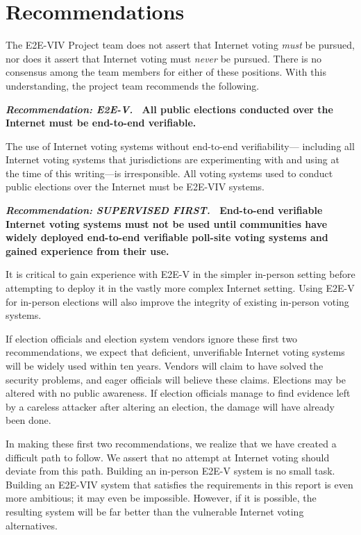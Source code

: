 \section{Recommendations}

The E2E-VIV Project team does not assert that Internet voting
\emph{must} be pursued, nor does it assert that Internet voting must
\emph{never} be pursued. There is no consensus among the team members
for either of these positions. With this understanding, the project
team recommends the following.

\vspace{12pt} 
\textbf{\emph{Recommendation: E2E-V.} \ All public elections conducted
  over the Internet must be end-to-end verifiable.} 

The use of Internet voting systems without end-to-end verifiability---
including all Internet voting systems that jurisdictions are
experimenting with and using at the time of this writing---is
irresponsible. All voting systems used to conduct public elections
over the Internet must be E2E-VIV systems.

\vspace{12pt}
\textbf{\emph{Recommendation: SUPERVISED FIRST.} \ End-to-end
  verifiable Internet voting systems must not be used until
  communities have widely deployed end-to-end verifiable poll-site
  voting systems and gained experience from their use.}

It is critical to gain experience with E2E-V in the simpler in-person
setting before attempting to deploy it in the vastly more complex
Internet setting. Using E2E-V for in-person elections will also
improve the integrity of existing in-person voting systems.
 
If election officials and election system vendors ignore these first
two recommendations, we expect that deficient, unverifiable Internet
voting systems will be widely used within ten years.  Vendors will
claim to have solved the security problems, and eager officials will
believe these claims.  Elections may be altered with no public
awareness.  If election officials manage to find evidence left by a
careless attacker after altering an election, the damage will have
already been done.
 
In making these first two recommendations, we realize that we have
created a difficult path to follow. We assert that no attempt at
Internet voting should deviate from this path.  Building an in-person
E2E-V system is no small task. Building an E2E-VIV system that
satisfies the requirements in this report is even more ambitious; it
may even be impossible. However, if it is possible, the resulting
system will be far better than the vulnerable Internet voting
alternatives.

